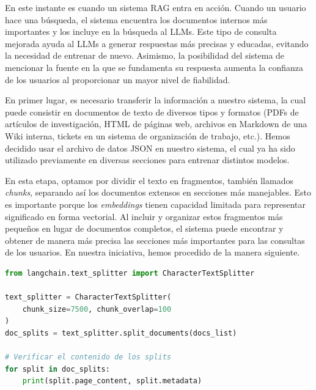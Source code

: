 \bigskip %

En este instante es cuando un sistema \acrshort{RAG} entra en acción. Cuando un usuario hace una búsqueda, el sistema encuentra los documentos internos más importantes y los incluye en la búsqueda al \acrshort{LLMs}. Este tipo de consulta mejorada ayuda al \acrshort{LLMs} a generar respuestas más precisas y educadas, evitando la necesidad de entrenar de nuevo. Asimismo, la posibilidad del sistema de mencionar la fuente en la que se fundamenta su respuesta aumenta la confianza de los usuarios al proporcionar un mayor nivel de fiabilidad.

\bigskip %

En primer lugar, es necesario transferir la información a nuestro sistema, la cual puede consistir en documentos de texto de diversos tipos y formatos (PDFs de artículos de investigación, HTML de páginas web, archivos en Markdown de una Wiki interna, tickets en un sistema de organización de trabajo, etc.). Hemos decidido usar el archivo de datos \acrshort{JSON} en nuestro sistema, el cual ya ha sido utilizado previamente en diversas secciones para entrenar distintos modelos.

\bigskip %

En esta etapa, optamos por dividir el texto en fragmentos, también llamados \textit{chunks}, separando así los documentos extensos en secciones más manejables. Esto es importante porque los \textit{\gls{embeddings}} tienen capacidad limitada para representar significado en forma vectorial. Al incluir y organizar estos fragmentos más pequeños en lugar de documentos completos, el sistema puede encontrar y obtener de manera más precisa las secciones más importantes para las consultas de los usuarios. En nuestra iniciativa, hemos procedido de la manera siguiente.

\bigskip %

\begin{lstlisting}[language=Python, caption={Fragmentación de texto.}, label=listado11]
from langchain.text_splitter import CharacterTextSplitter

text_splitter = CharacterTextSplitter(
    chunk_size=7500, chunk_overlap=100
)
doc_splits = text_splitter.split_documents(docs_list)

# Verificar el contenido de los splits
for split in doc_splits:
    print(split.page_content, split.metadata)

\end{lstlisting}

